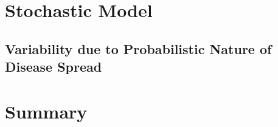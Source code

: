 \documentclass{article}[11pt]
\begin{document}





\section{Stochastic Model}
\subsection{Variability due to Probabilistic Nature of Disease Spread}

\section{Summary}
\end{document}
